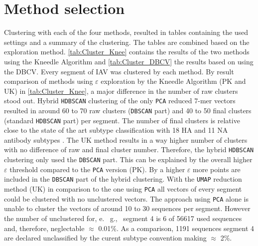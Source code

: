 \section{Method selection} \label{sec:Clustering}

Clustering with each of the four methods, resulted in tables containing the used settings and a summary of the clustering. The tables are combined based on the exploration method. \autoref{tab:Cluster_Knee} contains the results of the two methods using the Kneedle Algorithm and \autoref{tab:Cluster_DBCV} the results based on using the \gls{DBCV}. Every segment of \gls{IAV} was clustered by each method. By result comparison of methods using $\varepsilon$ exploration by the Kneedle Algorithm (PK and UK) in \autoref{tab:Cluster_Knee}, a major difference in the number of raw clusters stood out. Hybrid \texttt{HDBSCAN} clustering of the only \texttt{PCA} reduced 7-mer vectors resulted in around 60 to 70 raw clusters (\texttt{DBSCAN} part) and 40 to 50 final clusters (standard \texttt{HDBSCAN} part) per segment. The number of final clusters is relative close to the state of the art subtype classification with 18 \gls{HA} and 11 \gls{NA} antibody subtypes \autocite{noauthor_revision_1980}. The UK method results in a way higher number of clusters with no difference of raw and final cluster number. Therefore, the hybrid \texttt{HDBSCAN} clustering only used the \texttt{DBSCAN} part. This can be explained by the overall higher $\varepsilon$ threshold compared to the \texttt{PCA} version (PK). By a higher $\varepsilon$ more points are included in the \texttt{DBSCAN} part of the hybrid clustering. With the \texttt{UMAP} reduction method (UK) in comparison to the one using \texttt{PCA} all vectors of every segment could be clustered with no unclustered vectors. The approach using \texttt{PCA} alone is unable to cluster the vectors of around 10 to 30 sequences per segment. However the number of unclustered for, e.~ g.,~ segment 4 is 6 of 56617 used sequences and, therefore, neglectable $\approx$ 0.01\%. As a comparison, 1191 sequences segment 4 are declared unclassified by the curent subtype convention making $\approx$ 2\%. 

